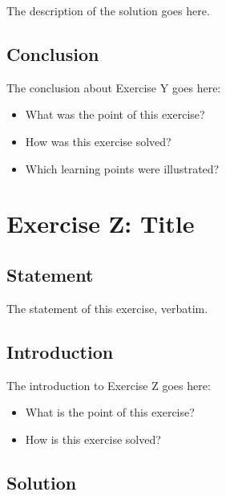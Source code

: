 \documentclass[12pt]{article}
\begin{document}
The description of the solution goes here.


\subsection{Conclusion}

The conclusion about Exercise Y goes here:

\begin{itemize}

\item
  What was the point of this exercise?

\item
  How was this exercise solved?

\item
  Which learning points were illustrated?

\end{itemize}


\newpage

\section{Exercise Z: Title}


\subsection{Statement}

The statement of this exercise, verbatim.


\subsection{Introduction}

The introduction to Exercise Z goes here:

\begin{itemize}

\item
  What is the point of this exercise?

\item
  How is this exercise solved?

\end{itemize}


\subsection{Solution}
\end{document}
